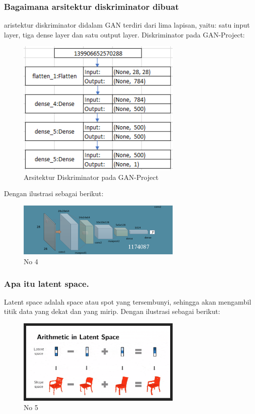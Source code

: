 \subsubsection{Bagaimana arsitektur diskriminator dibuat}
\hfill\break
aristektur diskriminator didalam GAN terdiri dari lima lapisan, yaitu: satu input layer, tiga dense layer dan satu output layer. Diskriminator pada GAN-Project:
\begin{figure}[H]
	\centering
	\includegraphics[width=8cm]{figures/1174087/8/4a.png}
	\caption{Arsitektur Diskriminator pada GAN-Project}
\end{figure}
Dengan ilustrasi sebagai berikut:
\begin{figure}[H]
	\centering
	\includegraphics[width=8cm]{figures/1174087/8/4.png}
	\caption{No 4}
\end{figure}

\subsubsection{Apa itu latent space.}
\hfill\break
Latent space adalah space atau spot yang tersembunyi, sehingga akan mengambil titik data yang dekat dan yang mirip.
Dengan ilustrasi sebagai berikut:
\begin{figure}[H]
	\centering
	\includegraphics[width=8cm]{figures/1174087/8/5.png}
	\caption{No 5}
\end{figure}

